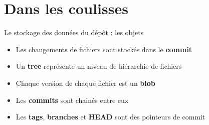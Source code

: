 \documentclass[xcolor=x11names,compress]{beamer}
\begin{document}
\section{Dans les coulisses}
\begin{frame}{Le stockage des données du dépôt : les objets}
		\begin{itemize}
			\item<1-> Les changements de fichiers sont stockés dans le \textbf{commit}
			\item<2-> Un \textbf{tree} représente un niveau de hiérarchie de fichiers
			\item<3-> Chaque version de chaque fichier est un \textbf{blob}
			\item<4-> Les \textbf{commits} sont chainés entre eux
			\item<5-> Les \textbf{tags}, \textbf{branches} et \textbf{HEAD} sont des pointeurs de commit
		\end{itemize}
		\begin{figure}[H]
			\centering
\end{figure}
\end{frame}
\end{document}
